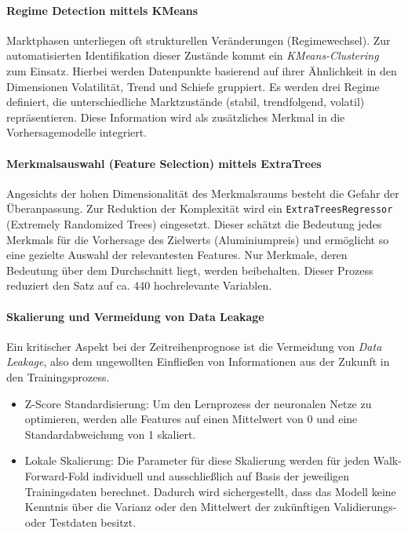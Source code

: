 \paragraph{Regime Detection mittels KMeans}
Marktphasen unterliegen oft strukturellen Veränderungen (Regimewechsel). Zur automatisierten Identifikation dieser Zustände kommt ein \emph{KMeans-Clustering} zum Einsatz. Hierbei werden Datenpunkte basierend auf ihrer Ähnlichkeit in den Dimensionen Volatilität, Trend und Schiefe gruppiert. Es werden drei Regime definiert, die unterschiedliche Marktzustände (stabil, trendfolgend, volatil) repräsentieren. Diese Information wird als zusätzliches Merkmal in die Vorhersagemodelle integriert.

\paragraph{Merkmalsauswahl (Feature Selection) mittels ExtraTrees}
Angesichts der hohen Dimensionalität des Merkmalsraums besteht die Gefahr der Überanpassung. Zur Reduktion der Komplexität wird ein \texttt{ExtraTreesRegressor} (Extremely Randomized Trees) eingesetzt. Dieser schätzt die Bedeutung jedes Merkmals für die Vorhersage des Zielwerts (Aluminiumpreis) und ermöglicht so eine gezielte Auswahl der relevantesten Features. Nur Merkmale, deren Bedeutung über dem Durchschnitt liegt, werden beibehalten. Dieser Prozess reduziert den Satz auf ca. 440 hochrelevante Variablen.

\paragraph{Skalierung und Vermeidung von Data Leakage}
Ein kritischer Aspekt bei der Zeitreihenprognose ist die Vermeidung von \emph{Data Leakage}, also dem ungewollten Einfließen von Informationen aus der Zukunft in den Trainingsprozess.
\begin{itemize}
    \item Z-Score Standardisierung: Um den Lernprozess der neuronalen Netze zu optimieren, werden alle Features auf einen Mittelwert von 0 und eine Standardabweichung von 1 skaliert.
    \item Lokale Skalierung: Die Parameter für diese Skalierung werden für jeden Walk-Forward-Fold individuell und ausschließlich auf Basis der jeweiligen Trainingsdaten berechnet. Dadurch wird sichergestellt, dass das Modell keine Kenntnis über die Varianz oder den Mittelwert der zukünftigen Validierungs- oder Testdaten besitzt.
\end{itemize}

